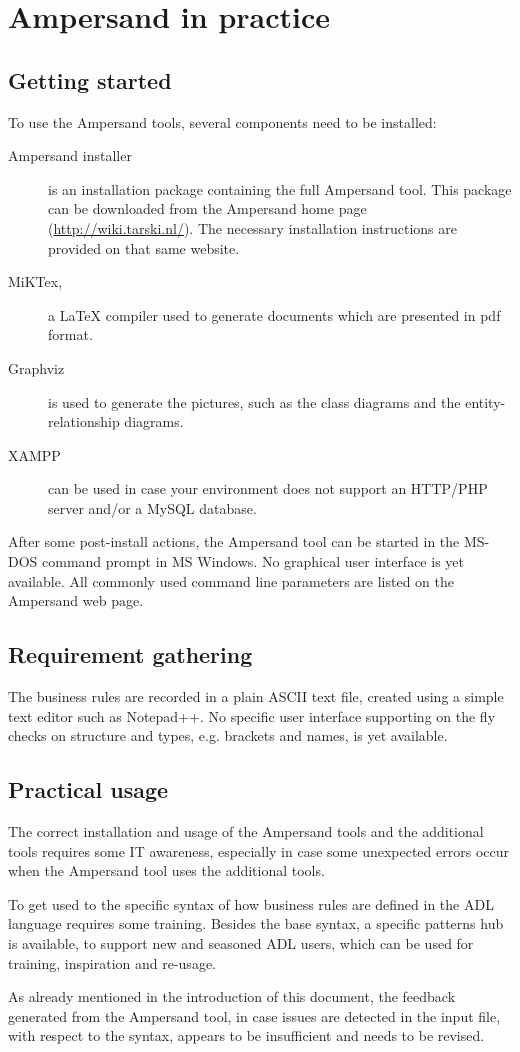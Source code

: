
\section{Ampersand in practice}
\label{sec:InPractice}

\subsection{Getting started}
To use the Ampersand tools, several components need to be installed:
\begin{description}
	\item[Ampersand installer] is an installation package containing the full Ampersand tool. This package can be downloaded from the Ampersand home page (\url{http://wiki.tarski.nl/}). The necessary installation instructions are provided on that same website.
	\item[MiKTex,] a LaTeX compiler used to generate documents which are presented in pdf format.
	\item[Graphviz] is used to generate the pictures, such as the class diagrams and the entity-relationship diagrams. 
	\item[XAMPP] can be used in case your environment does not support an HTTP/PHP server and/or a MySQL database.
\end{description}

\noindent
After some post-install actions, the Ampersand tool can be started in the MS-DOS command prompt in MS Windows. 
No graphical user interface is yet available. All commonly used command line parameters are listed on the Ampersand web page.

\subsection{Requirement gathering}
The business rules are recorded in a plain ASCII text file, created using a simple text editor such as Notepad++.
No specific user interface supporting on the fly checks on structure and types, e.g. brackets and names, is yet available.

\subsection{Practical usage}
The correct installation and usage of the Ampersand tools and the additional tools requires some IT awareness, especially in case some unexpected errors occur when the Ampersand tool uses the additional tools. 

To get used to the specific syntax of how business rules are defined in the ADL language requires some training. 
Besides the base syntax, a specific patterns hub is available, to support new and seasoned ADL users, which can be used for training, inspiration and re-usage.

As already mentioned in the introduction of this document, the feedback generated from the Ampersand tool, in case  issues are detected in the input file, with respect to the syntax, appears to be insufficient and needs to be revised.